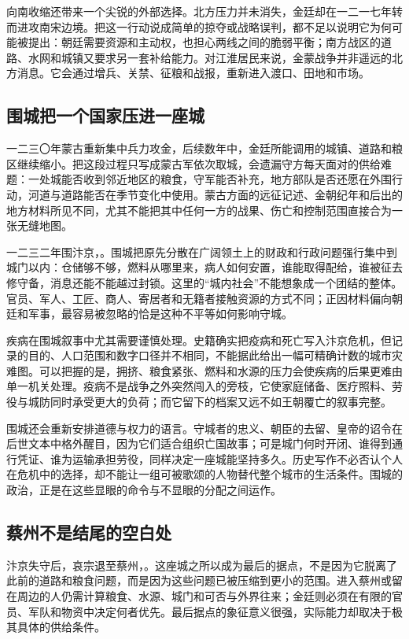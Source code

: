 向南收缩还带来一个尖锐的外部选择。北方压力并未消失，金廷却在一二一七年转而进攻南宋边境。把这一行动说成简单的掠夺或战略误判，都不足以说明它为何可能被提出：朝廷需要资源和主动权，也担心两线之间的脆弱平衡；南方战区的道路、水网和城镇又要求另一套补给能力。对江淮居民来说，金蒙战争并非遥远的北方消息。它会通过增兵、关禁、征粮和战报，重新进入渡口、田地和市场。

\subsection{围城把一个国家压进一座城}

一二三〇年蒙古重新集中兵力攻金，后续数年中，金廷所能调用的城镇、道路和粮区继续缩小。把这段过程只写成蒙古军依次取城，会遗漏守方每天面对的供给难题：一处城能否收到邻近地区的粮食，守军能否补充，地方部队是否还愿在外围行动，河道与道路能否在季节变化中使用。蒙古方面的远征记述、金朝纪年和后出的地方材料所见不同，尤其不能把其中任何一方的战果、伤亡和控制范围直接合为一张无缝地图。

一二三二年围汴京，。围城把原先分散在广阔领土上的财政和行政问题强行集中到城门以内：仓储够不够，燃料从哪里来，病人如何安置，谁能取得配给，谁被征去修守备，消息还能不能越过封锁。这里的“城内社会”不能想象成一个团结的整体。官员、军人、工匠、商人、寄居者和无籍者接触资源的方式不同；正因材料偏向朝廷和军事，最容易被忽略的恰是这种不平等如何影响守城。

疾病在围城叙事中尤其需要谨慎处理。史籍确实把疫病和死亡写入汴京危机，但记录的目的、人口范围和数字口径并不相同，不能据此给出一幅可精确计数的城市灾难图。可以把握的是，拥挤、粮食紧张、燃料和水源的压力会使疾病的后果更难由单一机关处理。疫病不是战争之外突然闯入的旁枝，它使家庭储备、医疗照料、劳役与城防同时承受更大的负荷；而它留下的档案又远不如王朝覆亡的叙事完整。

围城还会重新安排道德与权力的语言。守城者的忠义、朝臣的去留、皇帝的诏令在后世文本中格外醒目，因为它们适合组织亡国故事；可是城门何时开闭、谁得到通行凭证、谁为运输承担劳役，同样决定一座城能坚持多久。历史写作不必否认个人在危机中的选择，却不能让一组可被歌颂的人物替代整个城市的生活条件。围城的政治，正是在这些显眼的命令与不显眼的分配之间运作。

\subsection{蔡州不是结尾的空白处}

汴京失守后，哀宗退至蔡州，。这座城之所以成为最后的据点，不是因为它脱离了此前的道路和粮食问题，而是因为这些问题已被压缩到更小的范围。进入蔡州或留在周边的人仍需计算粮食、水源、城门和可否与外界往来；金廷则必须在有限的官员、军队和物资中决定何者优先。最后据点的象征意义很强，实际能力却取决于极其具体的供给条件。

